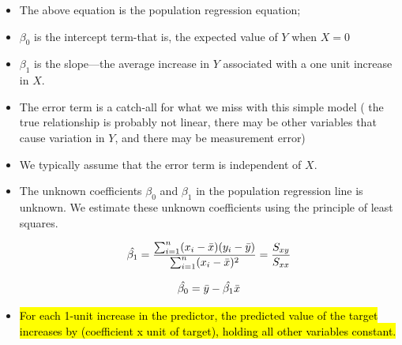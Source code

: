 \documentclass[11pt,a4paper]{article}
\newcommand{\highlighttextgreen}[1]{\textcolor{green!60!black}{#1}}
\newcommand{\highlighttextyellow}[1]{\hl{#1}}
\begin{document}
\begin{itemize}
    \item The above equation is the population regression equation;
    \item $\beta_0$ is the intercept term-that is, the expected value of $Y$ when $X=0$
    \item    
        \highlighttextgreen{$\beta_1$ is the slope—the average increase in $Y$ associated with a one unit increase in $X$.}
                
    \item The error term is a catch-all for what we miss with this simple model ( the true relationship is probably not linear, there may be other variables that cause variation in $Y$, and there may be measurement error)
    \item We typically assume that the error term is independent of $X$.

    \item The unknown coefficients $\beta_0$ and $\beta_1$ in the population regression line is unknown. We estimate these unknown coefficients using the principle of least squares.

    \begin{align*}\Large \hat{\beta_1} = \frac{\sum_{i=1}^{n} (x_i - \bar{x})(y_i-\bar{y})}{\sum_{i=1}^{n} (x_i - \bar{x})^2} = \frac{S_{xy}}{S_{xx}}
    \end{align*} 
    
    \begin{align*}
    \Large \hat{\beta_0} = \bar{y} - \hat{\beta_1}\bar{x}
    \end{align*}
    
    \item \highlighttextyellow{For each 1-unit increase in the predictor, the predicted value of the target increases by (coefficient x unit of target), holding all other variables constant.}
\end{itemize}
\end{document}
